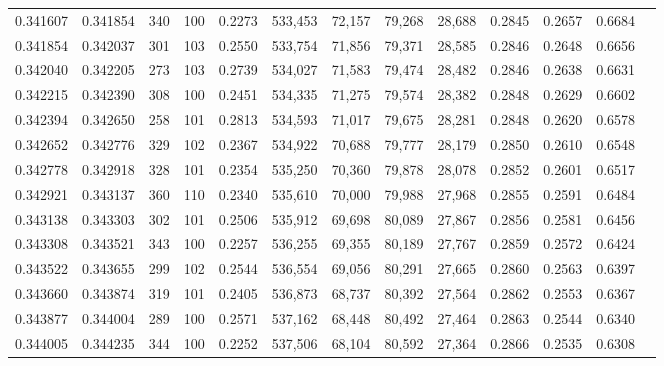 \begin{tabular}{rrrrrrrrrrrrr}
0.341607 & 0.341854 &   340 & 100 &                                     0.2273 & 533,453 &  72,157 &  79,268 &  28,688 & 0.2845 & 0.2657 & 0.6684 \\
0.341854 & 0.342037 &   301 & 103 &                                     0.2550 & 533,754 &  71,856 &  79,371 &  28,585 & 0.2846 & 0.2648 & 0.6656 \\
0.342040 & 0.342205 &   273 & 103 &                                     0.2739 & 534,027 &  71,583 &  79,474 &  28,482 & 0.2846 & 0.2638 & 0.6631 \\
0.342215 & 0.342390 &   308 & 100 &                                     0.2451 & 534,335 &  71,275 &  79,574 &  28,382 & 0.2848 & 0.2629 & 0.6602 \\
0.342394 & 0.342650 &   258 & 101 &                                     0.2813 & 534,593 &  71,017 &  79,675 &  28,281 & 0.2848 & 0.2620 & 0.6578 \\
0.342652 & 0.342776 &   329 & 102 &                                     0.2367 & 534,922 &  70,688 &  79,777 &  28,179 & 0.2850 & 0.2610 & 0.6548 \\
0.342778 & 0.342918 &   328 & 101 &                                     0.2354 & 535,250 &  70,360 &  79,878 &  28,078 & 0.2852 & 0.2601 & 0.6517 \\
0.342921 & 0.343137 &   360 & 110 &                                     0.2340 & 535,610 &  70,000 &  79,988 &  27,968 & 0.2855 & 0.2591 & 0.6484 \\
0.343138 & 0.343303 &   302 & 101 &                                     0.2506 & 535,912 &  69,698 &  80,089 &  27,867 & 0.2856 & 0.2581 & 0.6456 \\
0.343308 & 0.343521 &   343 & 100 &                                     0.2257 & 536,255 &  69,355 &  80,189 &  27,767 & 0.2859 & 0.2572 & 0.6424 \\
0.343522 & 0.343655 &   299 & 102 &                                     0.2544 & 536,554 &  69,056 &  80,291 &  27,665 & 0.2860 & 0.2563 & 0.6397 \\
0.343660 & 0.343874 &   319 & 101 &                                     0.2405 & 536,873 &  68,737 &  80,392 &  27,564 & 0.2862 & 0.2553 & 0.6367 \\
0.343877 & 0.344004 &   289 & 100 &                                     0.2571 & 537,162 &  68,448 &  80,492 &  27,464 & 0.2863 & 0.2544 & 0.6340 \\
0.344005 & 0.344235 &   344 & 100 &                                     0.2252 & 537,506 &  68,104 &  80,592 &  27,364 & 0.2866 & 0.2535 & 0.6308 \\

\end{tabular}

